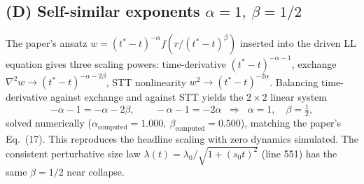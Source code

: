 \documentclass[11pt]{article}
\begin{document}
\subsection{(D) Self-similar exponents $\alpha=1,\ \beta=1/2$}
The paper's ansatz $w=(t^*-t)^{-\alpha}f(r/(t^*-t)^{\beta})$ inserted into the
driven LL equation gives three scaling powers: time-derivative
$(t^*-t)^{-\alpha-1}$, exchange $\nabla^2w\to(t^*-t)^{-\alpha-2\beta}$, STT
nonlinearity $w^2\to(t^*-t)^{-2\alpha}$. Balancing time-derivative against
exchange and against STT yields the $2\times2$ linear system
\begin{equation}
-\alpha-1=-\alpha-2\beta,\qquad -\alpha-1=-2\alpha
\;\;\Longrightarrow\;\;
\alpha=1,\quad\beta=\tfrac12,
\end{equation}
solved numerically ($\alpha_{\text{computed}}=1.000,\
\beta_{\text{computed}}=0.500$), matching the paper's Eq.~(17). This reproduces
the headline scaling with zero dynamics simulated. The consistent perturbative
size law $\lambda(t)=\lambda_0/\sqrt{1+(s_0t)^2}$ (line 551) has the same
$\beta=1/2$ near collapse.
\end{document}
